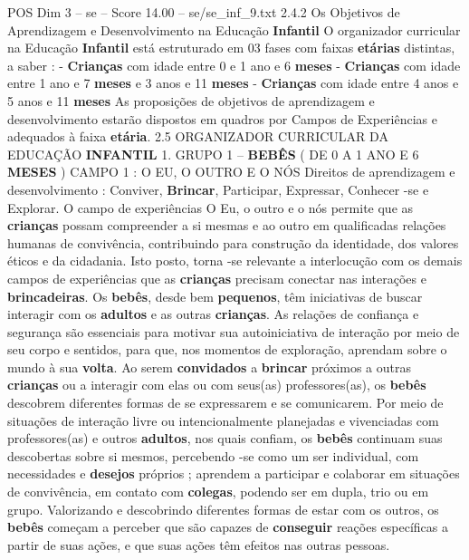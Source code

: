 \begin{textsample}{POS Dim 3 – se – Score 14.00 – se/se\_inf\_9.txt}  \label{ex:f3_pos_165}
2.4.2 Os Objetivos de Aprendizagem e Desenvolvimento na Educação \textbf{Infantil} O organizador curricular na Educação \textbf{Infantil} está estruturado em 03 fases com faixas \textbf{etárias} distintas, a saber : - \textbf{Crianças} com idade entre 0 e 1 ano e 6 \textbf{meses} - \textbf{Crianças} com idade entre 1 ano e 7 \textbf{meses} e 3 anos e 11 \textbf{meses} - \textbf{Crianças} com idade entre 4 anos e 5 anos e 11 \textbf{meses} As proposições de objetivos de aprendizagem e desenvolvimento estarão dispostos em quadros por Campos de Experiências e adequados à faixa \textbf{etária}. 2.5 ORGANIZADOR CURRICULAR DA EDUCAÇÃO \textbf{INFANTIL} 1.
GRUPO 1 – \textbf{BEBÊS} ( DE 0 A 1 ANO E 6 \textbf{MESES} ) CAMPO 1 : O EU, O OUTRO E O NÓS Direitos de aprendizagem e desenvolvimento : Conviver, \textbf{Brincar}, Participar, Expressar, Conhecer -se e Explorar.
O campo de experiências O Eu, o outro e o nós permite que as \textbf{crianças} possam compreender a si mesmas e ao outro em qualificadas relações humanas de convivência, contribuindo para construção da identidade, dos valores éticos e da cidadania.
Isto posto, torna -se relevante a interlocução com os demais campos de experiências que as \textbf{crianças} precisam conectar nas interações e \textbf{brincadeiras}.
Os \textbf{bebês}, desde bem \textbf{pequenos}, têm iniciativas de buscar interagir com os \textbf{adultos} e as outras \textbf{crianças}.
As relações de confiança e segurança são essenciais para motivar sua autoiniciativa de interação por meio de seu corpo e sentidos, para que, nos momentos de exploração, aprendam sobre o mundo à sua \textbf{volta}.
Ao serem \textbf{convidados} a \textbf{brincar} próximos a outras \textbf{crianças} ou a interagir com elas ou com seus(as) professores(as), os \textbf{bebês} descobrem diferentes formas de se expressarem e se comunicarem.
Por meio de situações de interação livre ou intencionalmente planejadas e vivenciadas com professores(as) e outros \textbf{adultos}, nos quais confiam, os \textbf{bebês} continuam suas descobertas sobre si mesmos, percebendo -se como um ser individual, com necessidades e \textbf{desejos} próprios ; aprendem a participar e colaborar em situações de convivência, em contato com \textbf{colegas}, podendo ser em dupla, trio ou em grupo.
Valorizando e descobrindo diferentes formas de estar com os outros, os \textbf{bebês} começam a perceber que são capazes de \textbf{conseguir} reações específicas a partir de suas ações, e que suas ações têm efeitos nas outras pessoas.

\end{textsample}

